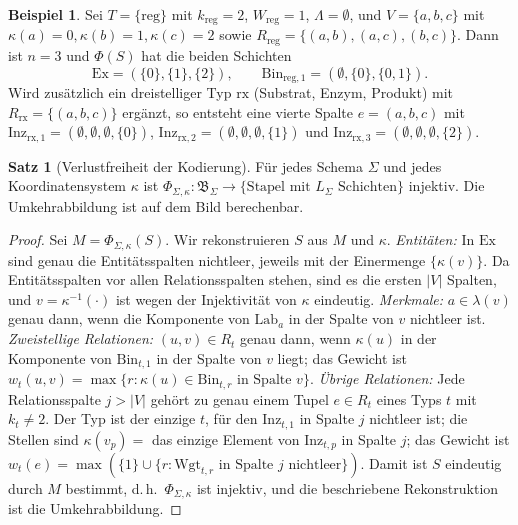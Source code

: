 \documentclass[a4paper,12pt, twoside]{report}
\theoremstyle{definition}
\newtheorem{beispiel}{Beispiel}
\newtheorem{satz}{Satz}
\begin{document}
\begin{beispiel}
	Sei $T=\{\mathrm{reg}\}$ mit $k_{\mathrm{reg}}=2$, $W_{\mathrm{reg}}=1$, $\Lambda=\emptyset$, und $V=\{a,b,c\}$ mit $\kappa(a)=0,\kappa(b)=1,\kappa(c)=2$ sowie $R_{\mathrm{reg}}=\{(a,b),(a,c),(b,c)\}$. Dann ist $n=3$ und $\Phi(S)$ hat die beiden Schichten
	\[
	\mathrm{Ex}=(\{0\},\{1\},\{2\}),\qquad \mathrm{Bin}_{\mathrm{reg},1}=(\emptyset,\{0\},\{0,1\}).
	\]
	Wird zusätzlich ein dreistelliger Typ $\mathrm{rx}$ (Substrat, Enzym, Produkt) mit $R_{\mathrm{rx}}=\{(a,b,c)\}$ ergänzt, so entsteht eine vierte Spalte $e=(a,b,c)$ mit $\mathrm{Inz}_{\mathrm{rx},1}=(\emptyset,\emptyset,\emptyset,\{0\})$, $\mathrm{Inz}_{\mathrm{rx},2}=(\emptyset,\emptyset,\emptyset,\{1\})$ und $\mathrm{Inz}_{\mathrm{rx},3}=(\emptyset,\emptyset,\emptyset,\{2\})$.
\end{beispiel}

\begin{satz}[Verlustfreiheit der Kodierung]
	\label{satz:univ_verlustfrei}
	Für jedes Schema $\Sigma$ und jedes Koordinatensystem $\kappa$ ist $\Phi_{\Sigma,\kappa}:\mathfrak{B}_\Sigma\to\{\text{Stapel mit }L_\Sigma\text{ Schichten}\}$ injektiv. Die Umkehrabbildung ist auf dem Bild berechenbar.
\end{satz}

\begin{proof}
	Sei $M=\Phi_{\Sigma,\kappa}(S)$. Wir rekonstruieren $S$ aus $M$ und $\kappa$.
	\emph{Entitäten:} In $\mathrm{Ex}$ sind genau die Entitätsspalten nichtleer, jeweils mit der Einermenge $\{\kappa(v)\}$. Da Entitätsspalten vor allen Relationsspalten stehen, sind es die ersten $|V|$ Spalten, und $v=\kappa^{-1}(\cdot)$ ist wegen der Injektivität von $\kappa$ eindeutig.
	\emph{Merkmale:} $a\in\lambda(v)$ genau dann, wenn die Komponente von $\mathrm{Lab}_a$ in der Spalte von $v$ nichtleer ist.
	\emph{Zweistellige Relationen:} $(u,v)\in R_t$ genau dann, wenn $\kappa(u)$ in der Komponente von $\mathrm{Bin}_{t,1}$ in der Spalte von $v$ liegt; das Gewicht ist $w_t(u,v)=\max\{r : \kappa(u)\in \mathrm{Bin}_{t,r}\text{ in Spalte }v\}$.
	\emph{Übrige Relationen:} Jede Relationsspalte $j>|V|$ gehört zu genau einem Tupel $e\in R_t$ eines Typs $t$ mit $k_t\ne2$. Der Typ ist der einzige $t$, für den $\mathrm{Inz}_{t,1}$ in Spalte $j$ nichtleer ist; die Stellen sind $\kappa(v_p)=$ das einzige Element von $\mathrm{Inz}_{t,p}$ in Spalte $j$; das Gewicht ist $w_t(e)=\max(\{1\}\cup\{r : \mathrm{Wgt}_{t,r}\text{ in Spalte }j\text{ nichtleer}\})$.
	Damit ist $S$ eindeutig durch $M$ bestimmt, d.\,h.\ $\Phi_{\Sigma,\kappa}$ ist injektiv, und die beschriebene Rekonstruktion ist die Umkehrabbildung.
\end{proof}
\end{document}
